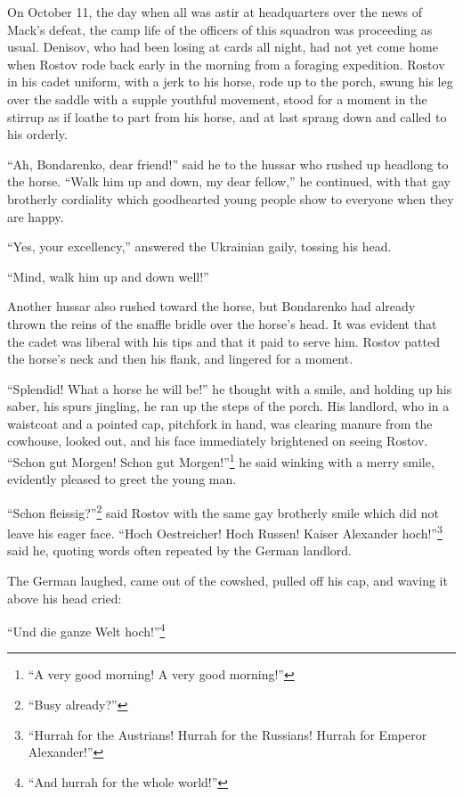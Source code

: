 On October 11, the day when all was astir at headquarters over
the news of Mack's defeat, the camp life of the officers of this
squadron was proceeding as usual. Denisov, who had been losing at
cards all night, had not yet come home when Rostov rode back
early in the morning from a foraging expedition. Rostov in his
cadet uniform, with a jerk to his horse, rode up to the porch,
swung his leg over the saddle with a supple youthful movement,
stood for a moment in the stirrup as if loathe to part from his
horse, and at last sprang down and called to his orderly.

``Ah, Bondarenko, dear friend!'' said he to the hussar who rushed
up headlong to the horse. ``Walk him up and down, my dear
fellow,'' he continued, with that gay brotherly cordiality which
goodhearted young people show to everyone when they are happy.

``Yes, your excellency,'' answered the Ukrainian gaily, tossing
his head.

``Mind, walk him up and down well!''

Another hussar also rushed toward the horse, but Bondarenko had
already thrown the reins of the snaffle bridle over the horse's
head. It was evident that the cadet was liberal with his tips and
that it paid to serve him. Rostov patted the horse's neck and
then his flank, and lingered for a moment.

``Splendid! What a horse he will be!'' he thought with a smile,
and holding up his saber, his spurs jingling, he ran up the steps
of the porch. His landlord, who in a waistcoat and a pointed cap,
pitchfork in hand, was clearing manure from the cowhouse, looked
out, and his face immediately brightened on seeing
Rostov. ``Schon gut Morgen! Schon gut Morgen!''\footnote{``A very
good morning! A very good morning!''} he said winking with a
merry smile, evidently pleased to greet the young man.

``Schon fleissig?''\footnote{``Busy already?''} said Rostov with
the same gay brotherly smile which did not leave his eager
face. ``Hoch Oestreicher! Hoch Russen! Kaiser Alexander
hoch!''\footnote{``Hurrah for the Austrians! Hurrah for the
Russians! Hurrah for Emperor Alexander!''} said he, quoting words
often repeated by the German landlord.

The German laughed, came out of the cowshed, pulled off his cap,
and waving it above his head cried:

``Und die ganze Welt hoch!''\footnote{``And hurrah for the whole
world!''}

